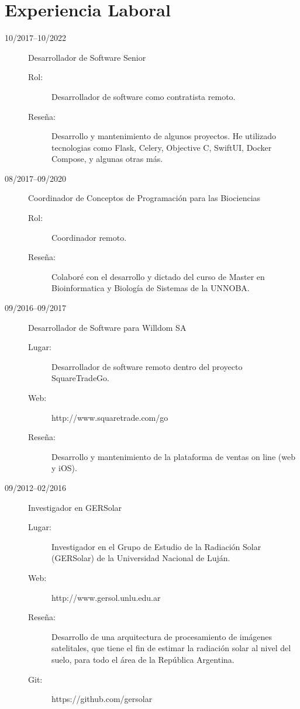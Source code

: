 \documentclass[a4paper]{article}
\begin{document}
\section{Experiencia Laboral}
\begin{description}
\item[10/2017--10/2022] Desarrollador de Software Senior
	\begin{description}
	\item[Rol: ] Desarrollador de software como contratista remoto.
	\item[Rese\~na: ]  Desarrollo y mantenimiento de algunos proyectos. He utilizado tecnologias como Flask, Celery, Objective C, SwiftUI, Docker Compose, y algunas otras m{\'a}s.
	\end{description}
\item[08/2017--09/2020] Coordinador de Conceptos de Programaci{\'o}n para las Biociencias
	\begin{description}
	\item[Rol: ] Coordinador remoto.
	\item[Rese\~na: ]  Colabor{\'e} con el desarrollo y dictado del curso de Master en Bioinformatica y Biolog{\'i}a de Sistemas de la UNNOBA.
	\end{description}
\item[09/2016--09/2017] Desarrollador de Software para Willdom SA
	\begin{description}
	\item[Lugar: ] Desarrollador de software remoto dentro del proyecto SquareTradeGo.
	\item[Web: ] http://www.squaretrade.com/go
	\item[Rese\~na: ]  Desarrollo y mantenimiento de la plataforma de ventas on line (web y iOS).
	\end{description}
\item[09/2012--02/2016] Investigador en GERSolar
	\begin{description}
	\item[Lugar: ] Investigador en el Grupo de Estudio de la Radiaci{\'o}n Solar (GERSolar) de la Universidad Nacional de Luj{\'a}n.
	\item[Web: ] http://www.gersol.unlu.edu.ar
	\item[Rese\~na: ]  Desarrollo de una arquitectura de procesamiento de im{\'a}genes satelitales, que tiene el fin  de estimar la radiaci{\'o}n solar al nivel del suelo, para todo el {\'a}rea de la Rep{\'u}blica Argentina.
	\item[Git: ] https://github.com/gersolar

\end{description}
\end{description}
\end{document}
